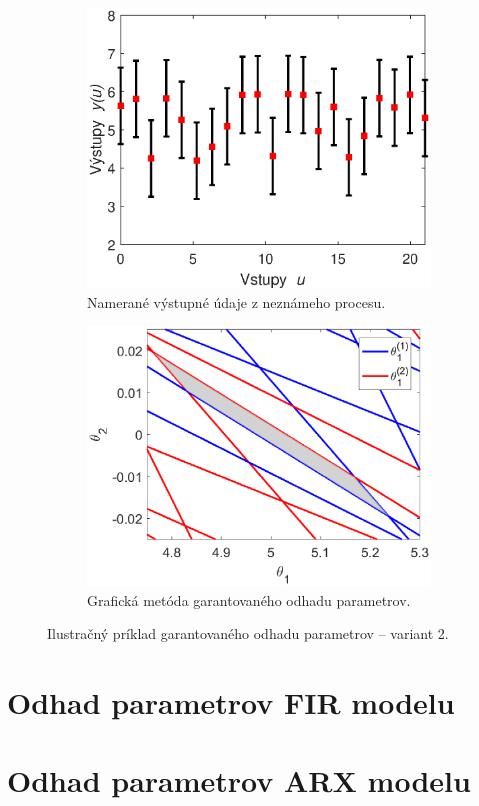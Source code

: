 \begin{figure}
	\centering
	\begin{subfigure}[b]{0.48\textwidth}
		\centering
		\includegraphics[width=\linewidth]{images/gpe_ex_data2}
		\caption{Namerané výstupné údaje z neznámeho procesu.}
		\label{gpe_ex2_data}
	\end{subfigure}
	\begin{subfigure}[b]{0.48\textwidth}
		\centering
		\includegraphics[width=\linewidth]{images/gpe_ex_line2}
		\caption{Grafická metóda garantovaného odhadu parametrov.}
		\label{gpe_ex2_gm}
	\end{subfigure}
	\caption{Ilustračný príklad garantovaného odhadu parametrov -- variant 2.}
	\label{gpe_ex2}
\end{figure}

\section{Odhad parametrov FIR modelu}

\section{Odhad parametrov ARX modelu}

